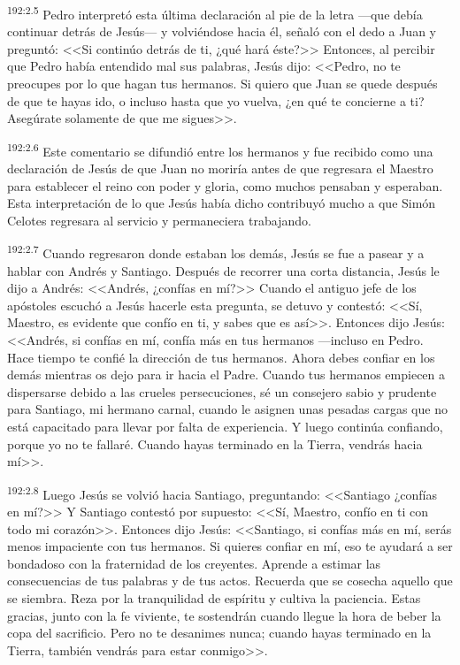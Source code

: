 \par 
\textsuperscript{192:2.5} Pedro interpretó esta última declaración al pie de la letra ---que debía continuar detrás de Jesús--- y volviéndose hacia él, señaló con el dedo a Juan y preguntó: <<Si continúo detrás de ti, ¿qué hará éste?>> Entonces, al percibir que Pedro había entendido mal sus palabras, Jesús dijo: <<Pedro, no te preocupes por lo que hagan tus hermanos. Si quiero que Juan se quede después de que te hayas ido, o incluso hasta que yo vuelva, ¿en qué te concierne a ti? Asegúrate solamente de que me sigues>>.

\par 
\textsuperscript{192:2.6} Este comentario se difundió entre los hermanos y fue recibido como una declaración de Jesús de que Juan no moriría antes de que regresara el Maestro para establecer el reino con poder y gloria, como muchos pensaban y esperaban. Esta interpretación de lo que Jesús había dicho contribuyó mucho a que Simón Celotes regresara al servicio y permaneciera trabajando.

\par 
\textsuperscript{192:2.7} Cuando regresaron donde estaban los demás, Jesús se fue a pasear y a hablar con Andrés y Santiago. Después de recorrer una corta distancia, Jesús le dijo a Andrés: <<Andrés, ¿confías en mí?>> Cuando el antiguo jefe de los apóstoles escuchó a Jesús hacerle esta pregunta, se detuvo y contestó: <<Sí, Maestro, es evidente que confío en ti, y sabes que es así>>. Entonces dijo Jesús: <<Andrés, si confías en mí, confía más en tus hermanos ---incluso en Pedro. Hace tiempo te confié la dirección de tus hermanos. Ahora debes confiar en los demás mientras os dejo para ir hacia el Padre. Cuando tus hermanos empiecen a dispersarse debido a las crueles persecuciones, sé un consejero sabio y prudente para Santiago, mi hermano carnal, cuando le asignen unas pesadas cargas que no está capacitado para llevar por falta de experiencia. Y luego continúa confiando, porque yo no te fallaré. Cuando hayas terminado en la Tierra, vendrás hacia mí>>.

\par 
\textsuperscript{192:2.8} Luego Jesús se volvió hacia Santiago, preguntando: <<Santiago ¿confías en mí?>> Y Santiago contestó por supuesto: <<Sí, Maestro, confío en ti con todo mi corazón>>. Entonces dijo Jesús: <<Santiago, si confías más en mí, serás menos impaciente con tus hermanos. Si quieres confiar en mí, eso te ayudará a ser bondadoso con la fraternidad de los creyentes. Aprende a estimar las consecuencias de tus palabras y de tus actos. Recuerda que se cosecha aquello que se siembra. Reza por la tranquilidad de espíritu y cultiva la paciencia. Estas gracias, junto con la fe viviente, te sostendrán cuando llegue la hora de beber la copa del sacrificio. Pero no te desanimes nunca; cuando hayas terminado en la Tierra, también vendrás para estar conmigo>>.

